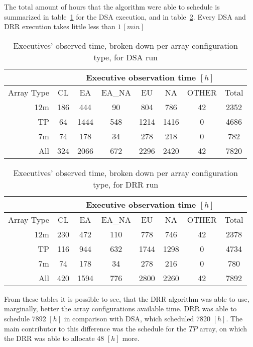 The total amount of hours that the algorithm were able to schedule is summarized in table~\ref{table:dsa-hours-per-array} for the DSA execution, and in table~\ref{table:drr-hours-per-array}. Every DSA and DRR execution takes little less than $1\,[min]$

\begin{table}[t]
\centering
\begin{tabular}{c|c|c|c|c|c|c|c|} 
\cline{2-8}
 & \multicolumn{7}{c|}{Executive observation time $[h]$} \\ \hline
\multicolumn{1}{|r|}{Array Type} & CL	& EA & EA\_NA &	EU & NA & OTHER & Total \\ \hline
\multicolumn{1}{|r|}{12m} & 186 & 444 & 90 & 804 & 786 & 42 & 2352 \\ \hline
\multicolumn{1}{|r|}{TP} & 64 & 1444 & 548 & 1214 & 1416 & 0 & 4686 \\ \hline
\multicolumn{1}{|r|}{7m} & 74 & 178 & 34 & 278 & 218 & 0 & 782 \\ \hline
\multicolumn{1}{|r|}{All} & 324 & 2066 & 672 & 2296 & 2420 & 42 & 7820 \\ \hline
\end{tabular}
\caption{Executives' observed time, broken down per array configuration type, for DSA run}
\label{table:dsa-hours-per-array}
\end{table}

\begin{table}[t]
\centering
\begin{tabular}{c|c|c|c|c|c|c|c|} 
\cline{2-8}
 & \multicolumn{7}{c|}{Executive observation time $[h]$} \\ \hline
 \multicolumn{1}{|r|}{Array Type} & CL	& EA & EA\_NA &	EU & NA & OTHER & Total \\ \hline
 \multicolumn{1}{|r|}{12m} &	230 & 	472 &	110 &	778 & 	746 &	42 & 2378 \\ \hline
 \multicolumn{1}{|r|}{TP} & 116 & 944 & 632 &	1744 &	1298 & 	0 &	4734 \\ \hline
 \multicolumn{1}{|r|}{7m} & 74	& 178 & 34 & 278 & 216 & 0 & 780 \\ \hline
 \multicolumn{1}{|r|}{All} & 420 & 1594 & 776 & 2800 & 2260 & 42 & 7892 \\ \hline
\end{tabular}
\caption{Executives' observed time, broken down per array configuration type, for DRR run}
\label{table:drr-hours-per-array}
\end{table}

From these tables it is possible to see, that the DRR algorithm was able to use, marginally, better the array configurations available time. DRR was able to schedule 7892 $[h]$ in comparison with DSA, which scheduled 7820 $[h]$. The main contributor to this difference was the schedule for the $TP$ array, on which the DRR was able to allocate 48 $[h]$ more. 

